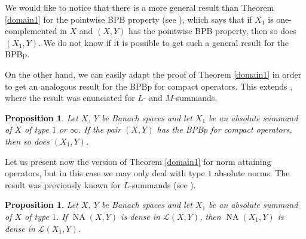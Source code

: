 \documentclass[10pt,a4paper]{amsart}
\theoremstyle{plain}
\newtheorem{prop}[theorem]{Proposition}
\theoremstyle{definition}
\DeclareMathOperator{\NA}{NA}
\begin{document}
We would like to notice that there is a more general result than Theorem \ref{domain1} for the pointwise BPB property (see \cite[Proposition 2.1]{DKKLM}), which says that if $X_1$ is one-complemented in $X$ and $(X, Y)$ has the pointwise BPB property, then so does $(X_1, Y)$. We do not know if it is possible to get such a general result for the BPBp.


On the other hand, we can easily adapt the proof of Theorem \ref{domain1}  in order to get an analogous result for the BPBp for compact operators. This extends \cite[Lemma 2.6.i]{DGMM}, where the result was enunciated for $L$- and $M$-summands.

\begin{prop} \label{domain2} Let $X$, $Y$ be Banach spaces and let $X_1$ be an absolute summand of $X$ of type $1$ or $\infty$. If the pair $(X, Y)$ has the BPBp for compact operators, then so does $(X_1, Y)$.
\end{prop}


Let us present now the version of Theorem \ref{domain1} for norm attaining operators, but in this case we may only deal with type $1$ absolute norms. The result was previously known for $L$-summands (see \cite[Lemma 2]{PS}).


\begin{prop} \label{NA1} Let $X$, $Y$ be Banach spaces and let $X_1$ be an absolute summand of $X$ of type $1$. If $\NA(X, Y)$ is dense in $\mathcal{L}(X, Y)$, then $\NA(X_1, Y)$ is dense in $\mathcal{L}(X_1, Y)$.
\end{prop}
\end{document}
